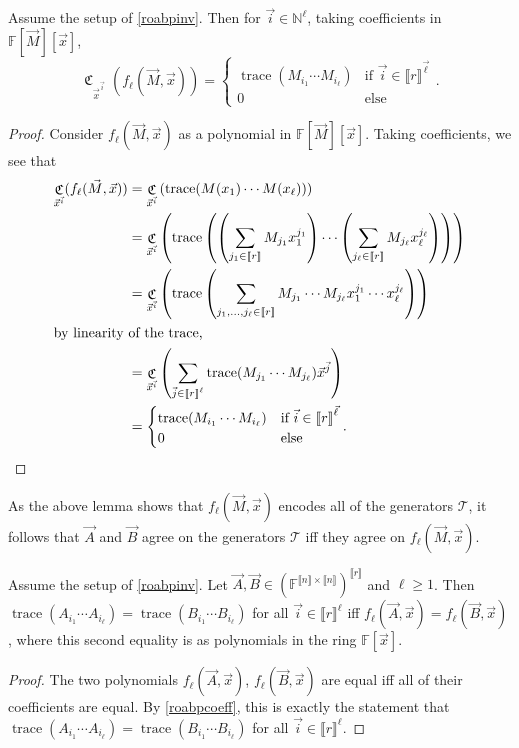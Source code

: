 \documentclass[letterpaper,11pt]{article}
\numberwithin{equation}{section}
\theoremstyle{plain}
\theoremstyle{remark}
\newcommand{\zr}[1]{{\llbracket {#1}\rrbracket}}
\DeclareMathOperator{\tr}{trace}
\DeclareMathOperator{\coeffo}{\mathfrak{C}}
\newcommand{\coeff}[1]{\coeffo_{#1}}
\newcommand{\F}{\mathbb{F}}
\newcommand{\N}{\mathbb{N}}
\newcommand{\cT}{\mathcal{T}}
\begin{document}
\begin{lemma}
	\label{roabpcoeff}
	Assume the setup of \autoref{roabpinv}. Then for $\vec{i}\in\N^\ell$, taking coefficients in $\F[\vec{M}][\vec{x}]$,
	\begin{equation*}
		\coeff{\vec{x}^{\vec{i}}}(f_\ell(\vec{M},\vec{x}))=
			\begin{cases}
				\tr(M_{i_1}\cdots M_{i_\ell})	& \text{if } \vec{i}\in\zr{r}^{\vec{\ell}}\\
				0				& \text{else}
			\end{cases}.
	\end{equation*}
\end{lemma}
\begin{proof}
	Consider $f_\ell(\vec{M},\vec{x})$ as a polynomial in $\F[\vec{M}][\vec{x}]$. Taking coefficients, we see that
	\begin{align*}
		\coeff{\vec{x}^{\vec{i}}}(f_\ell(\vec{M},\vec{x}))
		&=\coeff{\vec{x}^{\vec{i}}}\left(\tr(M(x_1)\cdots M(x_\ell))\right)\\
		&=\coeff{\vec{x}^{\vec{i}}}\left( \tr\left( \left(\sum_{j_1\in\zr{r}}M_{j_1}x_1^{j_1}\right)\cdots\left(\sum_{j_\ell\in\zr{r}}M_{j_\ell}x_\ell^{j_\ell}\right)\right)\right)\\
		&=\coeff{\vec{x}^{\vec{i}}}\left(\tr\left(\sum_{j_1,\ldots,j_\ell\in\zr{r}} M_{j_1}\cdots M_{j_\ell} x_1^{j_1}\cdots x_\ell^{j_\ell}\right)\right)\\
		\intertext{by linearity of the trace,}
		&=\coeff{\vec{x}^{\vec{i}}}\left(\sum_{\vec{j}\in\zr{r}^\ell} \tr(M_{j_1}\cdots M_{j_\ell})\vec{x}^{\vec{j}}\right)\\
		&=
			\begin{cases}
				\tr(M_{i_1}\cdots M_{i_\ell})	& \text{if } \vec{i}\in\zr{r}^{\vec{\ell}}\\
				0				& \text{else}
			\end{cases}.
		\qedhere
	\end{align*}
\end{proof}

As the above lemma shows that $f_\ell(\vec{M},\vec{x})$ encodes all of the generators $\cT$, it follows that $\vec{A}$ and $\vec{B}$ agree on the generators $\cT$ iff they agree on $f_\ell(\vec{M},\vec{x})$.

\begin{lemma}
	\label{coeffembed}
	Assume the setup of \autoref{roabpinv}. Let $\vec{A},\vec{B}\in(\F^{\zr{n}\times\zr{n}})^{\zr{r}}$ and $\ell\ge 1$. Then $\tr(A_{i_1}\cdots A_{i_\ell})=\tr(B_{i_1}\cdots B_{i_\ell})$ for all $\vec{i}\in\zr{r}^\ell$ iff $f_\ell(\vec{A},\vec{x})=f_\ell(\vec{B},\vec{x})$, where this second equality is as polynomials in the ring $\F[\vec{x}]$.
\end{lemma}
\begin{proof}
	The two polynomials $f_\ell(\vec{A},\vec{x})$, $f_\ell(\vec{B},\vec{x})$ are equal iff all of their coefficients are equal.  By \autoref{roabpcoeff}, this is exactly the statement that $\tr(A_{i_1}\cdots A_{i_\ell})=\tr(B_{i_1}\cdots B_{i_\ell})$ for all $\vec{i}\in\zr{r}^\ell$.
\end{proof}
\end{document}
